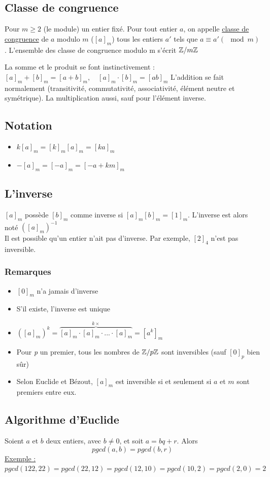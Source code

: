 \documentclass[11pt,a4paper]{article}
\renewcommand{\)}{\right)}
\renewcommand{\(}{\left(}
\begin{document}
\subsection{Classe de congruence}
Pour $m \geq 2$ (le module) un entier fixé. Pour tout entier $a$, on appelle \uline{classe de congruence} de $a$ modulo $m$ ($[a]_m$) tous les entiers $a'$ tels que $a \equiv a' (\mod m)$	. L'ensemble des classe de congruence modulo m s'écrit $\mathbb{Z}/m\mathbb{Z}$

La somme et le produit se font instinctivement : $[a]_m + [b]_m = [a+b]_m,\quad [a]_m \cdot [b]_m = [ab]_m$
L'addition se fait normalement (transitivité, commutativité, associativité, élément neutre et symétrique). La multiplication aussi, sauf pour l'élément inverse.
\subsection{Notation}
\begin{itemize}
	\item 	$k[a]_m = [k]_m[a]_m = [ka]_m$
	\item 	$-[a]_m = [-a]_m =[-a + km]_m$
\end{itemize}
\subsection{L'inverse}
$[a]_m$ possède $[b]_m$ comme inverse si $[a]_m[b]_m = [1]_m$. L'inverse est alors noté $([a]_m)^{-1}$\\
 Il est possible qu'un entier n'ait pas d'inverse. Par exemple, $[2]_4$ n'est pas inversible.
\subsubsection{Remarques}
\begin{itemize}
	\item 	$[0]_m$ n'a jamais d'inverse
	\item	S'il existe, l'inverse est unique
	\item 	$([a]_m)^k = \overbrace{[a]_m\cdot [a]_m \cdot ... \cdot [a]_m}^{k\times} = [a^k]_m$
	\item 	Pour \textit{p} un premier, tous les nombres de $\mathbb{Z}/p\mathbb{Z}$ sont inversibles (sauf $[0]_p$ bien sûr)
	\item 	Selon Euclide et Bézout, $[a]_m$ est inversible si et seulement si $a$ et $m$ sont premiers entre eux.
\end{itemize}

\subsection{Algorithme d'Euclide}
Soient $a$ et $b$ deux entiers, avec $b\neq 0$, et soit $a = bq + r$. Alors 
\begin{equation*}
	pgcd(a,b) = pgcd(b,r)
\end{equation*}
\uline{Exemple :}\\
$pgcd(122,22) = pgcd(22,12) = pgcd(12,10) = pgcd(10,2) = pgcd(2,0) = 2$	
\end{document}
